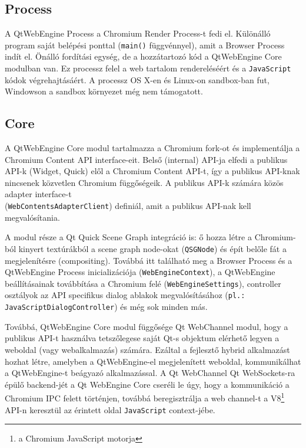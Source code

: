 \documentclass[12pt]{report}
\begin{document}
\subsection{Process}
A QtWebEngine Process a Chromium Render Process-t fedi el. Különálló program saját belépési
ponttal (\texttt{main()} függvénnyel), amit a Browser Process indít el. Önálló fordítási
egység, de a hozzátartozó kód a QtWebEngine Core modulban van.
Ez processz felel a web tartalom rendereléséért és a \texttt{JavaScript} kódok
végrehajtásáért. A processz OS X-en és Linux-on sandbox-ban fut, Windowson a sandbox
környezet még nem támogatott.

\subsection{Core}
A QtWebEngine Core modul tartalmazza a Chromium fork-ot és implementálja a \\
Chromium Content API interface-eit. Belső (internal) API-ja elfedi a publikus API-k
(Widget, Quick) elől a Chromium Content API-t, így a publikus API-knak nincsenek közvetlen
Chromium függőségeik. A publikus API-k számára közös adapter interface-t \\
(\texttt{WebContentsAdapterClient}) definiál, amit a publikus API-nak kell megvalósítania.

A modul része a Qt Quick Scene Graph integráció is: ő hozza létre a Chromium-ból
kinyert textúrákból a scene graph node-okat (\texttt{QSGNode}) és épít belőle fát a
megjelenítésre (compositing). Továbbá itt található meg a Browser Process és a QtWebEngine
Process inicializációja (\texttt{WebEngineContext}), a QtWebEngine beállításainak továbbítása
a Chromium felé (\texttt{WebEngineSettings}), controller osztályok az API specifikus
dialog ablakok megvalósításához (\texttt{pl.: JavaScriptDialogController}) és még sok minden
más.

Továbbá, QtWebEngine Core modul függősége Qt WebChannel modul, hogy a publikus API-t
használva tetszőlegese saját Qt-s objektum elérhető legyen a weboldal (vagy webalkalmazás)
számára. Ezáltal a fejlesztő hybrid alkalmazást hozhat létre, amelyben a QtWebEngine-el
megjelenített weboldal, kommunikálhat a QtWebEngine-t beágyazó alkalmazással.
A Qt WebChannel Qt WebSockets-ra épülő backend-jét a Qt WebEngine Core cseréli le úgy,
hogy a kommunikáció a Chromium IPC felett történjen, továbbá beregisztrálja a web channel-t
a V8\footnote{a Chromium JavaScript motorja} API-n keresztül az érintett oldal
\texttt{JavaScript} context-jébe.
\end{document}

